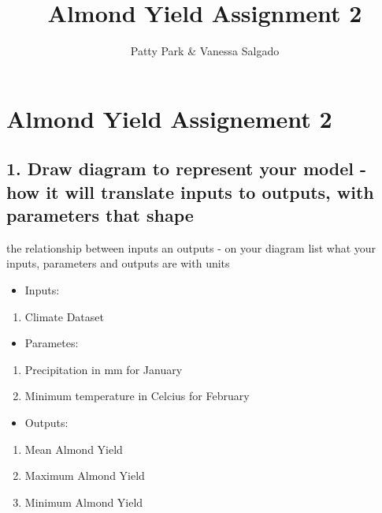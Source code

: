\documentclass[
]{article}
\title{Almond Yield Assignment 2}
\author{Patty Park \& Vanessa Salgado}
\date{}
\providecommand{\tightlist}{%
  \setlength{\itemsep}{0pt}\setlength{\parskip}{0pt}}
\begin{document}
\maketitle

\hypertarget{almond-yield-assignement-2}{%
\section{Almond Yield Assignement 2}\label{almond-yield-assignement-2}}

\hypertarget{draw-diagram-to-represent-your-model---how-it-will-translate-inputs-to-outputs-with-parameters-that-shape}{%
\subsection{1. Draw diagram to represent your model - how it will
translate inputs to outputs, with parameters that
shape}\label{draw-diagram-to-represent-your-model---how-it-will-translate-inputs-to-outputs-with-parameters-that-shape}}

the relationship between inputs an outputs - on your diagram list what
your inputs, parameters and outputs are with units

\begin{itemize}
\tightlist
\item
  Inputs:
\end{itemize}

\begin{enumerate}
\def\labelenumi{\arabic{enumi}.}
\tightlist
\item
  Climate Dataset
\end{enumerate}

\begin{itemize}
\tightlist
\item
  Parametes:
\end{itemize}

\begin{enumerate}
\def\labelenumi{\arabic{enumi}.}
\tightlist
\item
  Precipitation in mm for January
\item
  Minimum temperature in Celcius for February
\end{enumerate}

\begin{itemize}
\tightlist
\item
  Outputs:
\end{itemize}

\begin{enumerate}
\def\labelenumi{\arabic{enumi}.}
\tightlist
\item
  Mean Almond Yield
\item
  Maximum Almond Yield
\item
  Minimum Almond Yield
\end{enumerate}
\end{document}

